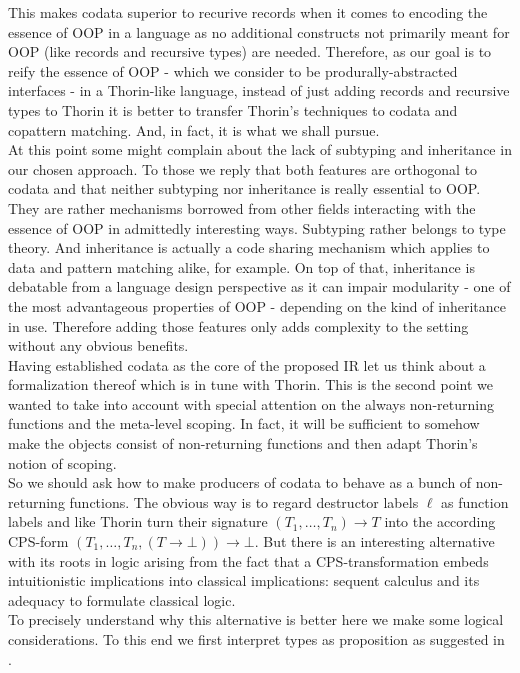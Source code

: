 This makes codata superior to recurive records when it comes to encoding the essence of OOP in a language as no additional constructs not primarily meant for OOP (like records and recursive types) are needed.
Therefore, as our goal is to reify the essence of OOP - which we consider to be produrally-abstracted interfaces - in a Thorin-like language, instead of just adding records and recursive types to Thorin it is better to transfer Thorin's techniques to codata and copattern matching.
And, in fact, it is what we shall pursue.
\\
At this point some might complain about the lack of subtyping and inheritance in our chosen approach.
To those we reply that both features are orthogonal to codata and that neither subtyping nor inheritance is really essential to OOP.
They are rather mechanisms borrowed from other fields interacting with the essence of OOP in admittedly interesting ways.
Subtyping rather belongs to type theory.
And inheritance is actually a code sharing mechanism which applies to data and pattern matching alike, for example.
On top of that, inheritance is debatable from a language design perspective as it can impair modularity - one of the most advantageous properties of OOP - depending on the kind of inheritance in use.
Therefore adding those features only adds complexity to the setting without any obvious benefits.
\\
Having established codata as the core of the proposed IR let us think about a formalization thereof which is in tune with Thorin.
This is the second point we wanted to take into account with special attention on the always non-returning functions and the meta-level scoping.
In fact, it will be sufficient to somehow make the objects consist of non-returning functions and then adapt Thorin's notion of scoping.
\\
So we should ask how to make producers of codata to behave as a bunch of non-returning functions.
The obvious way is to regard destructor labels $\ell$ as function labels and like Thorin turn their signature $(T_{1}, \ldots, T_{n}) \to T$ into the according CPS-form $(T_{1}, \ldots, T_{n}, (T \to \bot)) \to \bot$.
But there is an interesting alternative with its roots in logic arising from the fact that a CPS-transformation embeds intuitionistic implications into classical implications: sequent calculus and its adequacy to formulate classical logic.
\\
To precisely understand why this alternative is better here we make some logical considerations.
To this end we first interpret types as proposition as suggested in \cite{wadler}.
